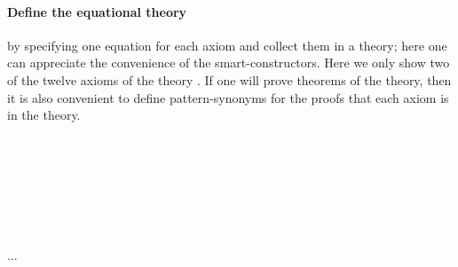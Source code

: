 \paragraph*{Define the equational theory}
\label{sec:define-equat-theory}

 by specifying one equation for
  each axiom and collect them in a theory; here one can appreciate the
  convenience of the smart-constructors. Here we only show two of the
  twelve axioms of the theory . If one will prove theorems
  of the theory, then it is also convenient to define pattern-synonyms
  for the proofs that each axiom is in the theory.

  \begin{code}
    \>[0]\AgdaSpace{}%
    \AgdaSymbol{:}\AgdaSpace{}%
    \<%
    \\
    \>[0]\AgdaSpace{}%
    \AgdaSymbol{=}\AgdaSpace{}%
    \AgdaSpace{}%
    \AgdaSpace{}%
    \AgdaSpace{}%
    \AgdaSpace{}%
    \AgdaSpace{}%
    \AgdaSymbol{(}\AgdaSpace{}%
    \AgdaSpace{}%
    \AgdaSymbol{)}\<%
    \\
    \\[\AgdaEmptyExtraSkip]%
    \>[2]\AgdaSpace{}%
    \AgdaSymbol{:}\AgdaSpace{}%
    \<%
    \\
    \>[2]\AgdaSpace{}%
    \AgdaSymbol{=}\AgdaSpace{}%
    \AgdaSpace{}%
    \AgdaSpace{}%
    \AgdaSpace{}%
    \AgdaSymbol{(}\AgdaSpace{}%
    \AgdaSymbol{)}\AgdaSpace{}%
    \AgdaSpace{}%
    \<%
    \\%
    \\[\AgdaEmptyExtraSkip]%
    \>[2]\AgdaSpace{}%
    \AgdaSymbol{:}\AgdaSpace{}%
    \AgdaSpace{}%
    \AgdaSpace{}%
    \AgdaSymbol{(}\AgdaSpace{}%
    \AgdaSpace{}%
    \AgdaSymbol{)}\<%
    \\
    \>[2]\AgdaSpace{}%
    \AgdaSymbol{=}\AgdaSpace{}%
    \AgdaSpace{}\AgdaSpace{}%
    \AgdaSymbol{,}\AgdaSpace{}%
    \AgdaSpace{}%
    \AgdaSymbol{,}\AgdaSpace{}%
    $\ldots$
    \<%
    \\%
    \\[\AgdaEmptyExtraSkip]%
    \>[2]\AgdaSpace{}%
    \AgdaSpace{}%
    \AgdaSymbol{=}\AgdaSpace{}%
    \<%
    \\
    \>[2]\AgdaSpace{}%
    \AgdaSpace{}%
    \AgdaSymbol{=}\AgdaSpace{}%
    \AgdaSpace{}%
    \<%
  \end{code}

